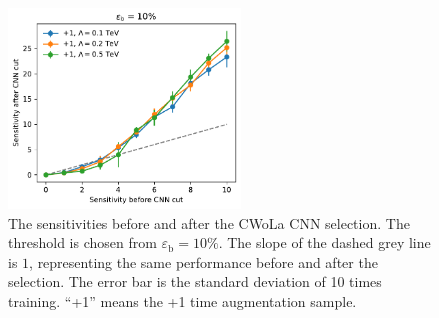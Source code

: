 \documentclass[12pt]{article}
\begin{document}
		\begin{figure}[htpb]
			\centering
			\includegraphics[width=0.55\textwidth]{HVmodel_sensitivity_improvement_bkg_eff_10_aug_1_std_01_02_05.pdf}
			\caption{The sensitivities before and after the CWoLa CNN selection. The threshold is chosen from $\varepsilon_{\text{b}} = 10\%$. The slope of the dashed grey line is $1$, representing the same performance before and after the selection. The error bar is the standard deviation of 10 times training. ``+1'' means the +1 time augmentation sample.}
			\label{fig:sensitivity_improvement_bkg_eff_01_smearing_scale}
		\end{figure}
\end{document}
